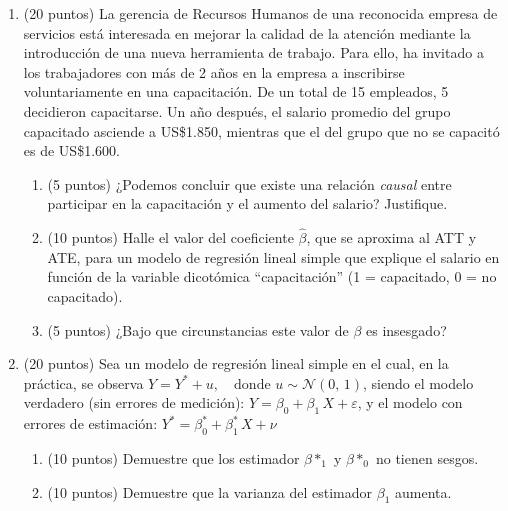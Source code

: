 \documentclass[10pt,a4paper]{article}
\begin{document}
\begin{enumerate}
    \item (20 puntos) La gerencia de Recursos Humanos de una reconocida empresa de servicios está interesada en mejorar la calidad de la atención mediante la introducción de una nueva herramienta de trabajo. Para ello, ha invitado a los trabajadores con más de 2 años en la empresa a inscribirse voluntariamente en una capacitación. De un total de 15 empleados, 5 decidieron capacitarse. Un año después, el salario promedio del grupo capacitado asciende a US\$1.850, mientras que el del grupo que no se capacitó es de US\$1.600.

\begin{enumerate}
    \item  (5 puntos) ¿Podemos concluir que existe una relación \textit{causal} entre participar en la capacitación y el aumento del salario? Justifique. \\


    \item  (10 puntos) Halle el valor del coeficiente $\hat{\beta}$, que se aproxima al ATT y ATE, para un modelo de regresión lineal simple que explique el salario en función de la variable dicotómica ``capacitación'' (1 = capacitado, 0 = no capacitado). \\


    \item (5 puntos) ¿Bajo que circunstancias este valor de $\beta$ es insesgado?\\


\end{enumerate}

\item (20 puntos) Sea un modelo de regresión lineal simple en el cual, en la práctica, se observa $
Y = Y^* + u, \quad \text{donde } u \sim \mathcal{N}(0,\,1)$,
siendo el modelo verdadero (sin errores de medición): $
Y = \beta_0 + \beta_1 \, X + \varepsilon$, y el modelo con errores de estimación: $
Y^* = \beta^*_0 + \beta^*_1 \, X + \nu$
\begin{enumerate}
    \item (10 puntos) Demuestre que los estimador $\beta*_1$ y $\beta*_0$ no tienen sesgos.


    \item (10 puntos) Demuestre que la varianza del estimador $\beta_1$ aumenta.

\end{enumerate}





\end{enumerate}
\end{document}
